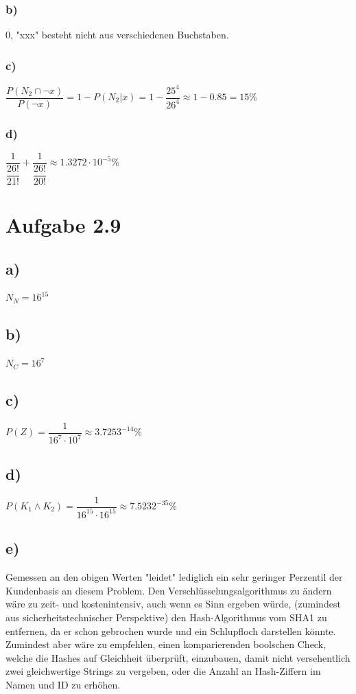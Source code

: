 \documentclass[12pt,a4paper]{article}
\begin{document}
	\subsubsection*{b)} 0, "xxx" besteht nicht aus verschiedenen Buchstaben.
	\subsubsection*{c)} $\dfrac{P(N_2\cap\neg{x})}{P(\neg{x})} = 1 - P(N_2|x) = 1 - \dfrac{25^4}{26^4} \approx 1 - 0.85 = 15\%$
	\subsubsection*{d)} $\dfrac{1}{\dfrac{26!}{21!}} + \dfrac{1}{\dfrac{26!}{20!}} \approx  1.3272 \cdot 10^{-5} \%$

	\section*{Aufgabe 2.9}
	\subsection*{a)} $N_N = 16^{15}$
	\subsection*{b)} $N_C = 16^7$
	\subsection*{c)} $P(Z) = \dfrac{1}{16^7 \cdot 10^7} \approx 3.7253^{-14}\%$
	\subsection*{d)} $P(K_1 \land K_2) = \dfrac{1}{16^{15} \cdot 16^{15}} \approx 7.5232^{-35}\%$
	\subsection*{e)} Gemessen an den obigen Werten "leidet" lediglich ein sehr geringer Perzentil der Kundenbasis
	an diesem Problem. Den Verschlüsselungsalgorithmus zu ändern wäre zu zeit- und kostenintensiv, auch wenn es Sinn
	ergeben würde, (zumindest aus sicherheitstechnischer Perspektive) den Hash-Algorithmus vom SHA1 zu entfernen, da
	er schon gebrochen wurde und ein Schlupfloch darstellen könnte. Zumindest aber wäre zu empfehlen, einen komparierenden
	boolschen Check, welche die Hashes auf Gleichheit überprüft, einzubauen, damit nicht versehentlich zwei gleichwertige
	Strings zu vergeben, oder die Anzahl an Hash-Ziffern im Namen und ID zu erhöhen.
\end{document}
